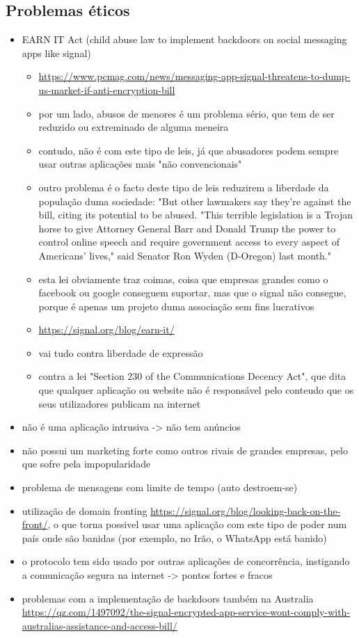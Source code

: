 \subsection{Problemas éticos}


\begin{itemize}
   \item EARN IT Act (child abuse law to implement backdoors on social messaging apps like signal)
   \begin{itemize}
      \item \url{https://www.pcmag.com/news/messaging-app-signal-threatens-to-dump-us-market-if-anti-encryption-bill}
      \item por um lado, abusos de menores é um problema sério, que tem de ser reduzido ou extreminado de alguma meneira
      \item contudo, não é com este tipo de leis, já que abusadores podem sempre usar outras aplicações mais "não convencionais" 
      \item outro problema é o facto deste tipo de leis reduzirem a liberdade da população duma sociedade: "But other lawmakers say they're against the bill, citing its potential to be abused. "This terrible legislation is a Trojan horse to give Attorney General Barr and Donald Trump the power to control online speech and require government access to every aspect of Americans' lives," said Senator Ron Wyden (D-Oregon) last month."
      \item esta lei obviamente traz coimas, coisa que empresas grandes como o facebook ou google conseguem suportar, mas que o signal não consegue, porque é apenas um projeto duma associação sem fins lucrativos
      \item \url{https://signal.org/blog/earn-it/}
      \item vai tudo contra liberdade de expressão
      \item contra a lei "Section 230 of the Communications Decency Act", que dita que qualquer aplicação ou website não é responsável pelo conteudo que os seus utilizadores publicam na internet
   \end{itemize}
   \item não é uma aplicação intrusiva -> não tem anúncios
   \item não possui um marketing forte como outros rivais de grandes empresas, pelo que sofre pela impopularidade
   \item problema de mensagens com limite de tempo (auto destroem-se)
   \item utilização de domain fronting \url{https://signal.org/blog/looking-back-on-the-front/}, o que torna possivel usar uma aplicação com este tipo de poder num país onde são banidas (por exemplo, no Irão, o WhatsApp está banido)
   \item o protocolo tem sido usado por outras aplicações de concorrência, instigando a comunicação segura na internet -> pontos fortes e fracos
   \item problemas com a implementação de backdoors também na Australia \url{https://qz.com/1497092/the-signal-encrypted-app-service-wont-comply-with-australias-assistance-and-access-bill/}
\end{itemize}

